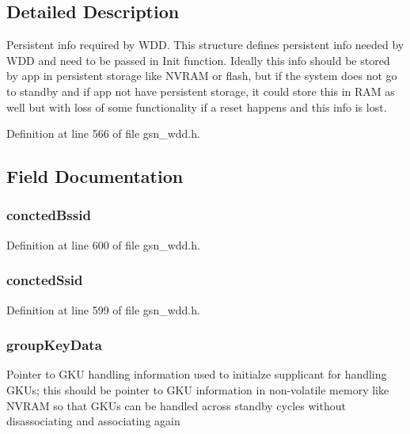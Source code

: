 \subsection{Detailed Description}
Persistent info required by WDD. This structure defines persistent info needed by WDD and need to be passed in Init function. Ideally this info should be stored by app in persistent storage like NVRAM or flash, but if the system does not go to standby and if app not have persistent storage, it could store this in RAM as well but with loss of some functionality if a reset happens and this info is lost. 

Definition at line 566 of file gsn\_\-wdd.h.



\subsection{Field Documentation}
\hypertarget{a00282_ab56e7a67403a851a38b9d031d7417ffd}{
\subsubsection[{conctedBssid}]{ {\bf conctedBssid}}}
\label{a00282_ab56e7a67403a851a38b9d031d7417ffd}


Definition at line 600 of file gsn\_\-wdd.h.

\hypertarget{a00282_ad6372ee4a4f4b10d14ac0b82ebefb1c8}{
\subsubsection[{conctedSsid}]{ {\bf conctedSsid}}}
\label{a00282_ad6372ee4a4f4b10d14ac0b82ebefb1c8}


Definition at line 599 of file gsn\_\-wdd.h.

\hypertarget{a00282_a80250fb031ce539c4d61c3af0fb90b98}{
\subsubsection[{groupKeyData}]{ {\bf groupKeyData}}}
\label{a00282_a80250fb031ce539c4d61c3af0fb90b98}
Pointer to GKU handling information used to initialze supplicant for handling GKUs; this should be pointer to GKU information in non-\/volatile memory like NVRAM so that GKUs can be handled across standby cycles without disassociating and associating again 

